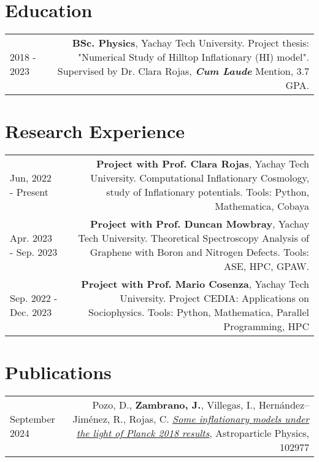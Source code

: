 \documentclass{article}
\begin{document}
\section*{Education}
\begin{tabular}{L!{\vrule}R}
	2018 - 2023 & \textbf{BSc. Physics}, Yachay Tech University. Project thesis: "Numerical Study of Hilltop Inflationary (HI) model". Supervised by Dr. Clara Rojas, \textbf{\textit{Cum Laude}} Mention, 3.7 GPA. \\
\end{tabular}

\section*{Research Experience}

\begin{tabular}{L!{\vrule}R}
    Jun, 2022 - Present   & \textbf{Project with Prof. Clara Rojas},  Yachay Tech University. Computational Inflationary Cosmology, study of Inflationary potentials. Tools: Python, Mathematica, Cobaya\\
    Apr. 2023 - Sep. 2023 & \textbf{Project with Prof. Duncan Mowbray}, Yachay Tech University. Theoretical Spectroscopy Analysis of Graphene with Boron and Nitrogen Defects. Tools: ASE, HPC, GPAW.\\
    Sep. 2022 - Dec. 2023 & \textbf{Project with Prof. Mario Cosenza}, Yachay Tech University. Project CEDIA: Applications on Sociophysics. Tools: Python, Mathematica, Parallel Programming, HPC  \\
    
\end{tabular}


\section*{Publications}

\begin{tabular}{L!{\vrule}R}
    September 2024 & 
    Pozo, D., \textbf{Zambrano, J.}, Villegas, I., Hernández–Jiménez, R., Rojas, C.
    \href{https://ui.adsabs.harvard.edu/abs/2024APh...16102977P/}{\textit{Some inflationary models under the light of Planck 2018 results}},
    Astroparticle Physics, 102977 \\
\end{tabular}
\end{document}
